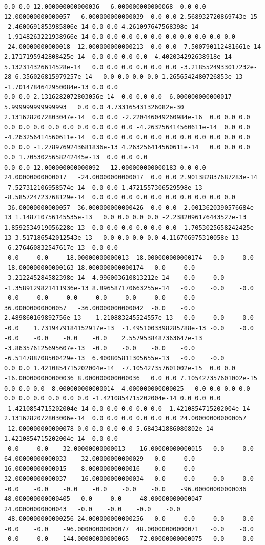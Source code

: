 \documentclass[12pt]{report} %
\begin{document}
\begin{landscape}
\begin{lstlisting}[numbers=none, basicstyle=\ttfamily\tiny, captionpos=b, caption={Matriz de coeficientes $W = G^{-1}$ ($54\times54$) calculada con Julia, sin redondear.}, label=cod:W-julia]
0.0	0.0	12.000000000000036	-6.000000000000068	0.0	0.0	12.000000000000057	-6.000000000000039	0.0	0.0	2.568932720869743e-15	-2.4600691853985806e-14	0.0	0.0	4.261097647568398e-14	-1.9148263221938966e-14	0.0	0.0	0.0	0.0	0.0	0.0	0.0	0.0	0.0	0.0	-24.00000000000018	12.000000000000213	0.0	0.0	-7.500790112481661e-14	2.1717195942808425e-14	0.0	0.0	0.0	0.0	-4.402034292638918e-14	5.132314326614528e-14	0.0	0.0	0.0	0.0	0.0	0.0	-3.2185524933017232e-28	6.356026815979257e-14	0.0	0.0	0.0	0.0	1.2656542480726853e-13	-1.7014784642950084e-13	0.0	0.0
0.0	0.0	2.1316282072803056e-14	0.0	0.0	0.0	-6.000000000000017	5.999999999999993	0.0	0.0	4.733165431326082e-30	2.1316282072803047e-14	0.0	0.0	-2.220446049260984e-16	0.0	0.0	0.0	0.0	0.0	0.0	0.0	0.0	0.0	0.0	0.0	0.0	-4.263256414560611e-14	0.0	0.0	-4.263256414560611e-14	0.0	0.0	0.0	0.0	0.0	0.0	0.0	0.0	0.0	0.0	0.0	0.0	0.0	-1.2789769243681836e-13	4.263256414560611e-14	0.0	0.0	0.0	0.0	1.7053025658242445e-13	0.0	0.0	0.0
0.0	0.0	12.000000000000092	-12.000000000000183	0.0	0.0	24.00000000000017	-24.00000000000017	0.0	0.0	2.901382837687283e-14	-7.527312106958574e-14	0.0	0.0	1.4721557306529598e-13	-8.585724723768129e-14	0.0	0.0	0.0	0.0	0.0	0.0	0.0	0.0	0.0	0.0	-36.00000000000057	36.000000000000426	0.0	0.0	-2.0013620390576684e-13	1.148710756145535e-13	0.0	0.0	0.0	0.0	-2.2382096176443527e-13	1.8592534919056228e-13	0.0	0.0	0.0	0.0	0.0	0.0	-1.7053025658242425e-13	3.517186542012543e-13	0.0	0.0	0.0	0.0	4.116706975310058e-13	-6.276460832547617e-13	0.0	0.0
-0.0	-0.0	-18.00000000000013	18.000000000000174	-0.0	-0.0	-18.000000000000163	18.000000000000174	-0.0	-0.0	-3.212245284582398e-14	4.996003610813212e-14	-0.0	-0.0	-1.3589129821411936e-13	8.896587170663255e-14	-0.0	-0.0	-0.0	-0.0	-0.0	-0.0	-0.0	-0.0	-0.0	-0.0	36.00000000000057	-36.00000000000042	-0.0	-0.0	2.489860169892756e-13	-1.210883245524557e-13	-0.0	-0.0	-0.0	-0.0	1.7319479184152917e-13	-1.4951003398285788e-13	-0.0	-0.0	-0.0	-0.0	-0.0	-0.0	2.5579538487363647e-13	-3.863576125695607e-13	-0.0	-0.0	-0.0	-0.0	-6.514788708500429e-13	6.400805811305655e-13	-0.0	-0.0
0.0	0.0	1.4210854715202004e-14	-7.105427357601002e-15	0.0	0.0	-16.000000000000036	8.000000000000036	0.0	0.0	7.105427357601002e-15	0.0	0.0	0.0	-8.000000000000014	4.000000000000025	0.0	0.0	0.0	0.0	0.0	0.0	0.0	0.0	0.0	0.0	-1.4210854715202004e-14	0.0	0.0	0.0	-1.4210854715202004e-14	0.0	0.0	0.0	0.0	0.0	-1.4210854715202004e-14	2.1316282072803006e-14	0.0	0.0	0.0	0.0	0.0	0.0	24.000000000000057	-12.000000000000078	0.0	0.0	0.0	0.0	5.684341886080802e-14	1.4210854715202004e-14	0.0	0.0
-0.0	-0.0	32.00000000000013	-16.00000000000015	-0.0	-0.0	64.00000000000033	-32.00000000000029	-0.0	-0.0	16.00000000000015	-8.00000000000016	-0.0	-0.0	32.00000000000037	-16.00000000000034	-0.0	-0.0	-0.0	-0.0	-0.0	-0.0	-0.0	-0.0	-0.0	-0.0	-96.00000000000036	48.000000000000405	-0.0	-0.0	-48.00000000000047	24.00000000000043	-0.0	-0.0	-0.0	-0.0	-48.000000000000256	24.000000000000256	-0.0	-0.0	-0.0	-0.0	-0.0	-0.0	-96.00000000000077	48.00000000000071	-0.0	-0.0	-0.0	-0.0	144.00000000000065	-72.00000000000075	-0.0	-0.0

\end{lstlisting}
\end{landscape}
\end{document}
